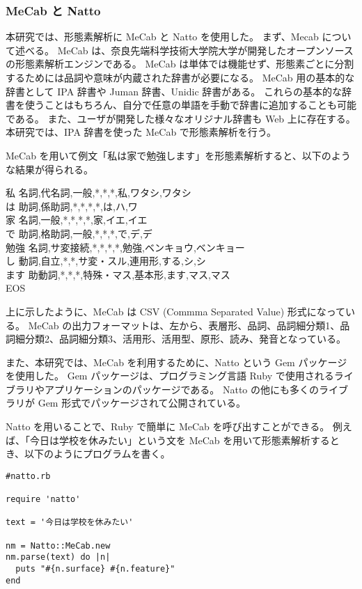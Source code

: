 \documentclass[11pt,a4j]{jsarticle}
\begin{document}
\subsubsection{MeCab と Natto}
本研究では、形態素解析に MeCab と Natto を使用した。
まず、Mecab について述べる。
MeCab  は、奈良先端科学技術大学院大学が開発したオープンソースの形態素解析エンジンである。
MeCab は単体では機能せず、形態素ごとに分割するためには品詞や意味が内蔵された辞書が必要になる。
MeCab 用の基本的な辞書として IPA 辞書や Juman 辞書、Unidic 辞書がある。
これらの基本的な辞書を使うことはもちろん、自分で任意の単語を手動で辞書に追加することも可能である。
また、ユーザが開発した様々なオリジナル辞書も Web 上に存在する。
本研究では、IPA 辞書を使った MeCab で形態素解析を行う。

MeCab を用いて例文「私は家で勉強します」を形態素解析すると、以下のような結果が得られる。

\begin{itembox}[l]
私  名詞,代名詞,一般,*,*,*,私,ワタシ,ワタシ\\
は  助詞,係助詞,*,*,*,*,は,ハ,ワ\\
家  名詞,一般,*,*,*,*,家,イエ,イエ\\
で  助詞,格助詞,一般,*,*,*,で,デ,デ\\
勉強  名詞,サ変接続,*,*,*,*,勉強,ベンキョウ,ベンキョー\\
し  動詞,自立,*,*,サ変・スル,連用形,する,シ,シ\\
ます  助動詞,*,*,*,特殊・マス,基本形,ます,マス,マス\\
EOS
\end{itembox}

上に示したように、MeCab は CSV (Commma Separated Value) 形式になっている。
MeCab の出力フォーマットは、左から、表層形、品詞、品詞細分類1、品詞細分類2、品詞細分類3、活用形、活用型、原形、読み、発音となっている。

また、本研究では、MeCab を利用するために、Natto という Gem パッケージを使用した。
Gem パッケージは、プログラミング言語 Ruby で使用されるライブラリやアプリケーションのパッケージである。
Natto の他にも多くのライブラリが Gem 形式でパッケージされて公開されている。

Natto を用いることで、Ruby で簡単に MeCab を呼び出すことができる。
例えば、「今日は学校を休みたい」という文を MeCab を用いて形態素解析するとき、以下のようにプログラムを書く。

\begin{verbatim}
#natto.rb

require 'natto'

text = '今日は学校を休みたい'

nm = Natto::MeCab.new
nm.parse(text) do |n|
  puts "#{n.surface} #{n.feature}"
end
\end{verbatim}
\end{document}
